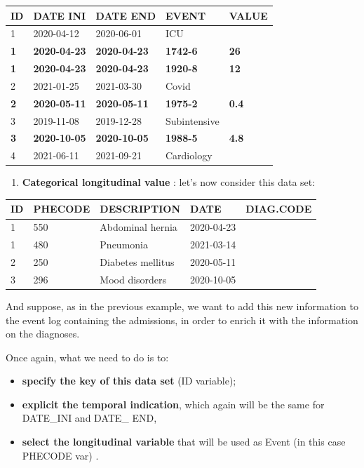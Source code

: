 \documentclass[
]{book}
\providecommand{\tightlist}{%
  \setlength{\itemsep}{0pt}\setlength{\parskip}{0pt}}
\begin{document}
\begin{longtable}[]{@{}lllll@{}}
\toprule
ID & DATE INI & DATE END & EVENT & VALUE \\
\midrule
\endhead
1 & 2020-04-12 & 2020-06-01 & ICU & \\
\textbf{1} & \textbf{2020-04-23} & \textbf{2020-04-23} & \textbf{1742-6} & \textbf{26} \\
\textbf{1} & \textbf{2020-04-23} & \textbf{2020-04-23} & \textbf{1920-8 } & \textbf{12} \\
2 & 2021-01-25 & 2021-03-30 & Covid & \\
\textbf{2} & \textbf{2020-05-11} & \textbf{2020-05-11} & \textbf{1975-2} & \textbf{0.4} \\
3 & 2019-11-08 & 2019-12-28 & Subintensive & \\
\textbf{3} & \textbf{2020-10-05} & \textbf{2020-10-05} & \textbf{1988-5} & \textbf{4.8} \\
4 & 2021-06-11 & 2021-09-21 & Cardiology & \\
\bottomrule
\end{longtable}

\begin{enumerate}
\def\labelenumi{\arabic{enumi}.}
\setcounter{enumi}{1}
\tightlist
\item
  \textbf{Categorical longitudinal value} : let's now consider this data set:
\end{enumerate}

\begin{longtable}[]{@{}lllll@{}}
\toprule
ID & PHECODE & DESCRIPTION & DATE & DIAG.CODE \\
\midrule
\endhead
1 & 550 & Abdominal hernia & 2020-04-23 & \\
1 & 480 & Pneumonia & 2021-03-14 & \\
2 & 250 & Diabetes mellitus & 2020-05-11 & \\
3 & 296 & Mood disorders & 2020-10-05 & \\
\bottomrule
\end{longtable}

And suppose, as in the previous example, we want to add this new information to
the event log containing the admissions, in order to enrich it with the
information on the diagnoses.

Once again, what we need to do is to:

\begin{itemize}
\tightlist
\item
  \textbf{specify the key of this data set} (ID variable);
\item
  \textbf{explicit the temporal indication}, which again will be the same for DATE\_INI and
  DATE\_ END,
\item
  \textbf{select the longitudinal variable} that will be used as Event (in this case PHECODE var) .
\end{itemize}
\end{document}
